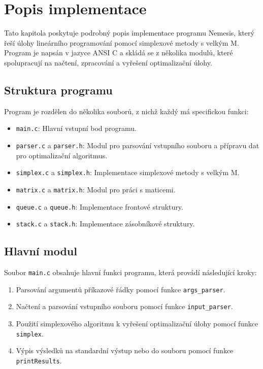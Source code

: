\documentclass[czech, sem, kiv, he, pdf, viewonly]{fasthesis}
\begin{document}
\chapter{Popis implementace}
Tato kapitola poskytuje podrobný popis implementace programu Nemesis, který řeší úlohy lineárního programování pomocí simplexové metody s velkým M. Program je napsán v jazyce ANSI C a skládá se z několika modulů, které spolupracují na načtení, zpracování a vyřešení optimalizační úlohy.

\section{Struktura programu}
Program je rozdělen do několika souborů, z nichž každý má specifickou funkci:
\begin{itemize}
    \item \texttt{main.c}: Hlavní vstupní bod programu.
    \item \texttt{parser.c} a \texttt{parser.h}: Modul pro parsování vstupního souboru a přípravu dat pro optimalizační algoritmus.
    \item \texttt{simplex.c} a \texttt{simplex.h}: Implementace simplexové metody s velkým M.
    \item \texttt{matrix.c} a \texttt{matrix.h}: Modul pro práci s maticemi.
    \item \texttt{queue.c} a \texttt{queue.h}: Implementace frontové struktury.
    \item \texttt{stack.c} a \texttt{stack.h}: Implementace zásobníkové struktury.
\end{itemize}

\section{Hlavní modul}
Soubor \texttt{main.c} obsahuje hlavní funkci programu, která provádí následující kroky:
\begin{enumerate}
    \item Parsování argumentů příkazové řádky pomocí funkce \texttt{args\_parser}.
    \item Načtení a parsování vstupního souboru pomocí funkce \texttt{input\_parser}.
    \item Použití simplexového algoritmu k vyřešení optimalizační úlohy pomocí funkce \texttt{simplex}.
    \item Výpis výsledků na standardní výstup nebo do souboru pomocí funkce \texttt{printResults}.
\end{enumerate}
\end{document}

